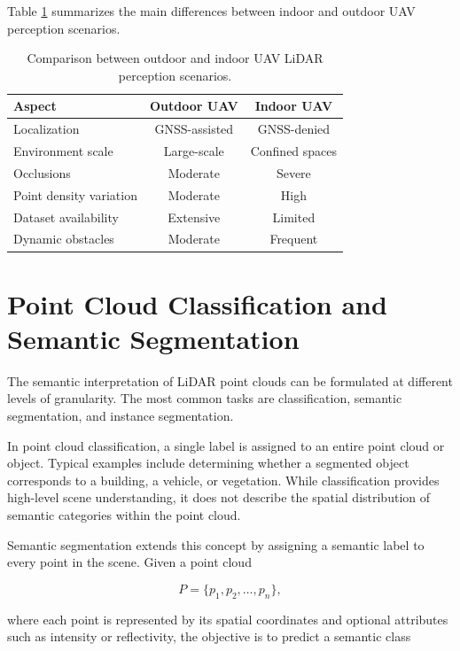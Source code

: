 Table \ref{tab:indoor_outdoor_comparison} summarizes the main differences between indoor and outdoor UAV perception scenarios.

\begin{table}[H]
\centering
\caption{Comparison between outdoor and indoor UAV LiDAR perception scenarios.}
\label{tab:indoor_outdoor_comparison}
\begin{tabular}{|l|c|c|}
\hline
\textbf{Aspect} & \textbf{Outdoor UAV} & \textbf{Indoor UAV} \\
\hline
Localization & GNSS-assisted & GNSS-denied \\
\hline
Environment scale & Large-scale & Confined spaces \\
\hline
Occlusions & Moderate & Severe \\
\hline
Point density variation & Moderate & High \\
\hline
Dataset availability & Extensive & Limited \\
\hline
Dynamic obstacles & Moderate & Frequent \\
\hline
\end{tabular}
\end{table}



\section{Point Cloud Classification and Semantic Segmentation}
\label{sec:classification_segmentation}

The semantic interpretation of LiDAR point clouds can be formulated at different levels of granularity. The most common tasks are classification, semantic segmentation, and instance segmentation.

In point cloud classification, a single label is assigned to an entire point cloud or object. Typical examples include determining whether a segmented object corresponds to a building, a vehicle, or vegetation. While classification provides high-level scene understanding, it does not describe the spatial distribution of semantic categories within the point cloud.

Semantic segmentation extends this concept by assigning a semantic label to every point in the scene. Given a point cloud

\[
P = \{p_1,p_2,\ldots,p_n\},
\]

where each point is represented by its spatial coordinates and optional attributes such as intensity or reflectivity, the objective is to predict a semantic class

